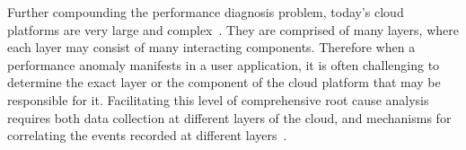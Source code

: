 %

Further compounding the performance
diagnosis problem, today's cloud platforms are very 
large and complex~\cite{DaCunhaRodrigues:2016:MCC:2851613.2851619,Ibidunmoye:2015:PAD:2808687.2791120}. 
They are
comprised of many layers, where each layer may consist of many interacting components.
Therefore when a performance anomaly manifests in a user application, it is
often challenging
to determine the exact layer or the component of the cloud platform that may be responsible for it. 
Facilitating this level of comprehensive root cause analysis requires
both data collection at different layers of the cloud, and mechanisms for correlating 
the events recorded at different layers~\cite{7420511}. 
%
%



